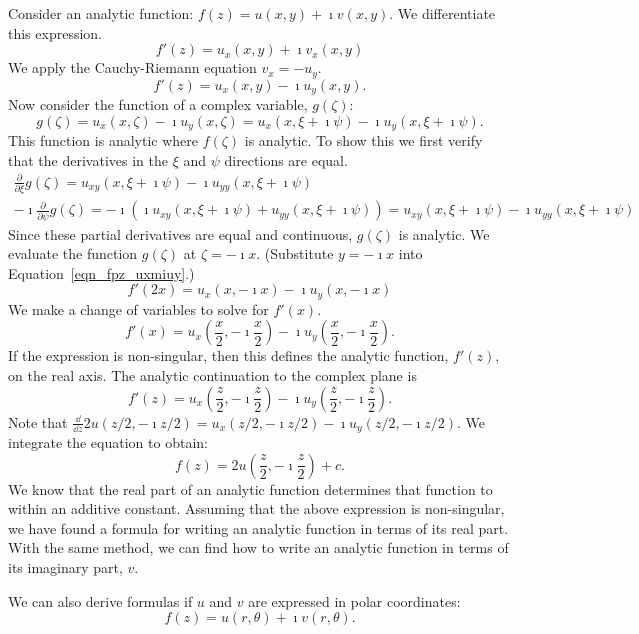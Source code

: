 Consider an analytic function: $f(z) = u(x,y) + \imath v(x,y)$.
We differentiate this expression.
\[
f'(z) = u_x(x,y) + \imath v_x(x,y)
\]
We apply the Cauchy-Riemann equation $v_x = - u_y$.
\begin{equation}
  \label{eqn_fpz_uxmiuy}
  f'(z) = u_x(x,y) - \imath u_y(x,y).
\end{equation}
Now consider the function of a complex variable, $g(\zeta)$:
\[
g(\zeta) = u_x(x, \zeta) - \imath u_y(x, \zeta)
= u_x(x, \xi + \imath \psi ) - \imath u_y(x, \xi + \imath \psi ).
\]
This function is analytic where $f(\zeta)$ is analytic.  To show this we 
first verify that the derivatives in the $\xi$ and $\psi$ directions
are equal.
\begin{gather*}
  \frac{\partial}{\partial \xi} g(\zeta) 
  = u_{x y}(x, \xi + \imath \psi) - \imath u_{y y}(x, \xi + \imath \psi) 
  \\
  -\imath \frac{\partial}{\partial \psi} g(\zeta) 
  = -\imath \left( \imath u_{x y}(x, \xi + \imath \psi) + u_{y y}(x, \xi + \imath \psi) \right) 
  = u_{x y}(x, \xi + \imath \psi) - \imath u_{y y}(x, \xi + \imath \psi)
\end{gather*}
Since these partial derivatives are equal and continuous, $g(\zeta)$ is 
analytic.  We evaluate the function $g(\zeta)$ at $\zeta = -\imath x$.
(Substitute $y = - \imath x$ into Equation~\ref{eqn_fpz_uxmiuy}.)
\[
f'(2 x) = u_x(x,-\imath x) - \imath u_y(x,-\imath x)
\]
We make a change of variables to solve for $f'(x)$.
\[
f'(x) = u_x \left( \frac{x}{2}, -\imath \frac{x}{2} \right) 
- \imath u_y\left( \frac{x}{2}, -\imath \frac{x}{2} \right).
\]
If the expression is non-singular, then
this defines the analytic function, $f'(z)$, on the real axis.  The analytic
continuation to the complex plane is
\[
f'(z) = u_x \left( \frac{z}{2}, -\imath \frac{z}{2} \right) 
- \imath u_y \left( \frac{z}{2}, -\imath \frac{z}{2} \right).
\]
Note that 
$\frac{\dd}{\dd z} 2 u(z/2, -\imath z/2) = u_x(z/2, -\imath z/2) -\imath u_y(z/2, -\imath z/2)$.
We integrate the equation to obtain:
\[
f(z) = 2 u \left( \frac{z}{2}, -\imath \frac{z}{2} \right) + c.
\]
We know that the real part of an analytic function determines that 
function to within an additive constant.
Assuming that the above expression is non-singular, we have found a formula
for writing an analytic function in terms of its real part.  
With the same method, we can find how to write an analytic function in terms 
of its imaginary part, $v$.

We can also derive formulas if $u$ and $v$ are expressed in polar coordinates:
\[
f(z) = u(r, \theta) + \imath v(r, \theta).
\]


